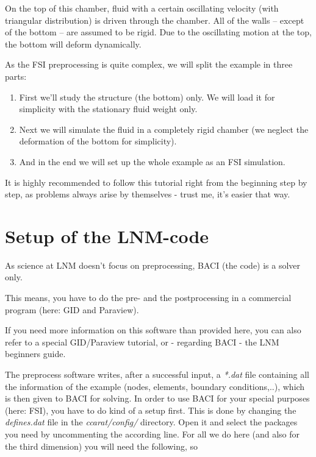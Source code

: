 On the top of this chamber, fluid with a certain oscillating velocity
(with triangular distribution) is driven through the chamber. All
of the walls -- except of the bottom -- are assumed to be rigid. Due
to the oscillating motion at the top, the bottom will deform dynamically.

As the FSI preprocessing is quite complex, we will split the example
in three parts:

\begin{enumerate}
\item First we'll study the structure (the bottom) only. We will load it
for simplicity with the stationary fluid weight only.
\item Next we will simulate the fluid in a completely rigid chamber (we
neglect the deformation of the bottom for simplicity).
\item And in the end we will set up the whole example as an FSI simulation.
\end{enumerate}
It is highly recommended to follow this tutorial right from the beginning
step by step, as problems always arise by themselves - trust me, it's
easier that way.


\section{Setup of the LNM-code}

As science at LNM doesn't focus on preprocessing, BACI (the code)
is a solver only.

This means, you have to do the pre- and the postprocessing in a commercial
program (here: GID and Paraview). 

If you need more information on this software than provided here,
you can also refer to a special GID/Paraview tutorial, or - regarding
BACI - the LNM beginners guide.

The preprocess software writes, after a successful input, a \emph{{*}.dat}
file containing all the information of the example (nodes, elements,
boundary conditions,..), which is then given to BACI for solving.
In order to use BACI for your special purposes (here: FSI), you have
to do kind of a setup first. This is done by changing the \emph{defines.dat}
file in the \emph{ccarat/config/} directory. Open it and select the
packages you need by uncommenting the according line. For all we do
here (and also for the third dimension) you will need the following,
so

